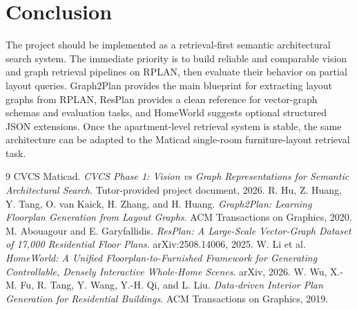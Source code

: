 \documentclass[11pt,a4paper]{article}
\begin{document}
\section{Conclusion}

The project should be implemented as a retrieval-first semantic architectural search system. The immediate priority is to build reliable and comparable vision and graph retrieval pipelines on RPLAN, then evaluate their behavior on partial layout queries. Graph2Plan provides the main blueprint for extracting layout graphs from RPLAN, ResPlan provides a clean reference for vector-graph schemas and evaluation tasks, and HomeWorld suggests optional structured JSON extensions. Once the apartment-level retrieval system is stable, the same architecture can be adapted to the Maticad single-room furniture-layout retrieval task.

\begin{thebibliography}{9}
 CVCS Maticad. \textit{CVCS Phase 1: Vision vs Graph Representations for Semantic Architectural Search}. Tutor-provided project document, 2026.
 R. Hu, Z. Huang, Y. Tang, O. van Kaick, H. Zhang, and H. Huang. \textit{Graph2Plan: Learning Floorplan Generation from Layout Graphs}. ACM Transactions on Graphics, 2020.
 M. Abouagour and E. Garyfallidis. \textit{ResPlan: A Large-Scale Vector-Graph Dataset of 17,000 Residential Floor Plans}. arXiv:2508.14006, 2025.
 W. Li et al. \textit{HomeWorld: A Unified Floorplan-to-Furnished Framework for Generating Controllable, Densely Interactive Whole-Home Scenes}. arXiv, 2026.
 W. Wu, X.-M. Fu, R. Tang, Y. Wang, Y.-H. Qi, and L. Liu. \textit{Data-driven Interior Plan Generation for Residential Buildings}. ACM Transactions on Graphics, 2019.
\end{thebibliography}
\end{document}

